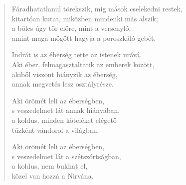 \begin{verse}
 Fáradhatatlanul törekszik, míg mások cselekedni restek,\\
kitartóan kutat, miközben mindenki más alszik;\\
a bölcs úgy tör előre, mint a versenyló,\\
amint maga mögött hagyja a poroszkáló gebét.

 Indrát is az éberség tette az istenek urává.\\
Aki éber, felmagasztaltatik az emberek között,\\
akiből viszont hiányzik az éberség,\\
annak megvetés lesz osztályrésze.

 Aki örömét leli az éberségben,\\
s veszedelmet lát annak hiányában,\\
a koldus, minden köteléket elégető\\
tűzként vándorol a világban.

 Aki örömét leli az éberségben,\\
s veszedelmet lát a szétszórtságban,\\
a koldus, nem bukhat el,\\
közel van hozzá a Nirvána.

\end{verse}
